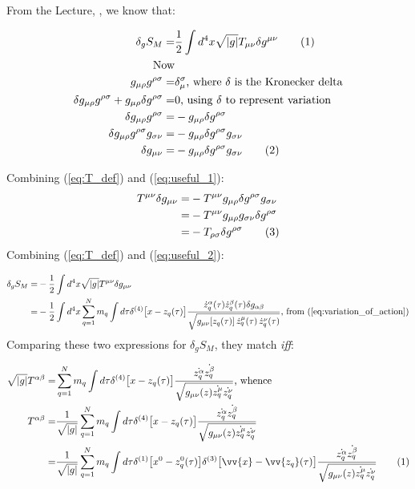\documentclass[]{article}
\newcommand\numberthis{\addtocounter{equation}{1}\tag{\theequation}}
\begin{document}
From the Lecture, \cite[(73)]{akhmedev2016}, we know that:

\begin{align*}
\delta_g S_M =& \frac{1}{2} \int d^4 x \sqrt{|g|} T_{\mu\nu} \delta g^{\mu\nu} \numberthis \label {eq:T_def} \\
\text{Now}&\\
g_{\mu\rho}g^{\rho\sigma} =& \delta_{\mu}^{\sigma} \text{, where $\delta$ is the Kronecker delta}\\
\delta g_{\mu\rho}g^{\rho\sigma} + g_{\mu\rho}\delta g^{\rho\sigma} =& 0 \text{, using $\delta$ to represent variation}\\
\delta g_{\mu\rho}g^{\rho\sigma} =& - g_{\mu\rho}\delta g^{\rho\sigma}\\
\delta g_{\mu\rho}g^{\rho\sigma} g_{\sigma\nu} =& - g_{\mu\rho}\delta g^{\rho\sigma} g_{\sigma\nu} \\
\delta g_{\mu\nu} =& - g_{\mu\rho}\delta g^{\rho\sigma} g_{\sigma\nu} \numberthis \label {eq:useful_1}
\end{align*}

Combining (\ref{eq:T_def}) and (\ref{eq:useful_1}):
\begin{align*}
T^{\mu\nu}\delta g_{\mu\nu} =& - T^{\mu\nu} g_{\mu\rho}\delta g^{\rho\sigma} g_{\sigma\nu}\\
=& - T^{\mu\nu} g_{\mu\rho} g_{\sigma\nu} \delta g^{\rho\sigma}\\
=& -T_{\rho\sigma}\delta g^{\rho\sigma} \numberthis \label {eq:useful_2}
\end{align*}
Combining (\ref{eq:T_def}) and (\ref{eq:useful_2}):

\begin{align*}
\delta_g S_M =& - \frac{1}{2} \int d^4 x \sqrt{|g|} T^{\mu\nu} \delta g_{\mu\nu}\\
=& - \frac{1}{2} \int d^4 x \sum_{q=1}^N m_q \int d \tau \delta^{(4)} \big[x - z_q(\tau)\big] \frac{ \dot{z}_q^\alpha(\tau) \dot{z}_q^\beta(\tau) \delta g_{\alpha\beta}}{ \sqrt{g_{\mu\nu}[z_q(\tau)] \, \dot{z}_q^\mu(\tau)\, \dot{z}_q^\nu(\tau)}} \text{, from (\ref{eq:variation_of_action})}
\end{align*}
Comparing these two expressions for $\delta_g S_M$, they match \emph{iff}:

\begin{align*}
\sqrt{|g|} T^{\alpha\beta} =&  \sum_{q=1}^{N} m_q \int d\tau \delta^{(4)} \big[x-z_q(\tau)\big]\frac{\dot{z_q^\alpha} \dot{z_q^\beta}}{\sqrt{g_{\mu\nu}(z)\dot{z_q^\mu}\dot{z_q^\nu}}} \text{, whence} \\
T^{\alpha\beta} =& \frac{1}{\sqrt{|g|}} \sum_{q=1}^{N} m_q \int d\tau \delta^{(4)} \big[x-z_q(\tau)\big]\frac{\dot{z_q^\alpha} \dot{z_q^\beta}}{\sqrt{g_{\mu\nu}(z)\dot{z_q^\mu}\dot{z_q^\nu}}} \\
=& \frac{1}{\sqrt{|g|}} \sum_{q=1}^{N} m_q \int d\tau \delta^{(1)} \big[x^0-z^0_q(\tau)\big]\delta^{(3)} \big[\vv{x}-\vv{z_q}(\tau)\big]\frac{\dot{z_q^\alpha} \dot{z_q^\beta}}{\sqrt{g_{\mu\nu}(z)\dot{z_q^\mu}\dot{z_q^\nu}}} \numberthis \label{eq:T_penult}
\end{align*}
\end{document}
